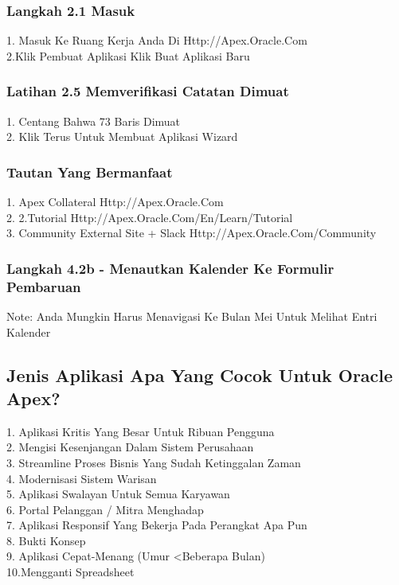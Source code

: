 \documentclass{article}
\begin{document}
{\subsubsection{Langkah 2.1 Masuk}
1. Masuk Ke Ruang Kerja Anda Di Http://Apex.Oracle.Com\\
2.Klik Pembuat Aplikasi Klik Buat Aplikasi Baru

\subsubsection{Latihan 2.5 Memverifikasi Catatan Dimuat}
1. Centang Bahwa 73 Baris Dimuat\\
2. Klik Terus Untuk Membuat Aplikasi Wizard


\subsubsection{Tautan Yang Bermanfaat}
1.	Apex  Collateral Http://Apex.Oracle.Com\\
2.	2.Tutorial Http://Apex.Oracle.Com/En/Learn/Tutorial\\
3.	Community External Site + Slack Http://Apex.Oracle.Com/Community

\subsubsection{Langkah 4.2b - Menautkan Kalender Ke Formulir Pembaruan}
Note: Anda Mungkin Harus Menavigasi Ke Bulan Mei Untuk Melihat Entri Kalender

\subsection{Jenis Aplikasi Apa Yang Cocok Untuk Oracle Apex?}
1. Aplikasi Kritis Yang Besar Untuk Ribuan Pengguna\\
2. Mengisi Kesenjangan Dalam Sistem Perusahaan\\
3. Streamline Proses Bisnis Yang Sudah Ketinggalan Zaman\\
4. Modernisasi Sistem Warisan\\
5. Aplikasi Swalayan Untuk Semua Karyawan\\
6. Portal Pelanggan / Mitra Menghadap\\
7. Aplikasi Responsif Yang Bekerja Pada Perangkat Apa Pun\\
8. Bukti Konsep\\
9. Aplikasi Cepat-Menang (Umur <Beberapa Bulan)\\
10.Mengganti Spreadsheet

}
\end{document}
